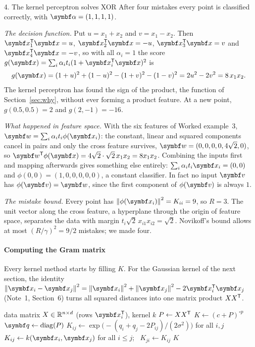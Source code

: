 \documentclass[11pt]{article}
\newcommand{\w}{\vect{w}}
\newcommand{\z}{\vect{z}}
\newcommand{\valpha}{\vect{\alpha}}
\begin{document}
\begin{worked}{4. The kernel perceptron solves XOR}
\noindent After four mistakes every point is classified correctly, with $\valpha = (1, 1, 1, 1)$.

\emph{The decision function.} Put $u = x_1 + x_2$ and $v = x_1 - x_2$. Then $\x_1\T\x = u$, $\x_2\T\x = -u$,
$\x_3\T\x = v$ and $\x_4\T\x = -v$, so with all $\alpha_i = 1$ the score $g(\x) = \sum_i \alpha_it_i(1 + \x_i\T\x)^2$ is
\[
  g(\x) = (1 + u)^2 + (1 - u)^2 - (1 + v)^2 - (1 - v)^2 = 2u^2 - 2v^2 = 8\,x_1x_2 .
\]
The kernel perceptron has found the sign of the product, the function of Section~\ref{sec:why}, without ever forming a
product feature. At a new point, $g(0.5, 0.5) = 2$ and $g(2, -1) = -16$.

\emph{What happened in feature space.} With the six features of Worked example~3, $\w = \sum_i \alpha_i t_i\phi(\x_i)$:
the constant, linear and squared components cancel in pairs and only the cross feature survives,
$\w = (0, 0, 0, 0, 4\sqrt2, 0)$, so $\w\T\phi(\x) = 4\sqrt2 \cdot \sqrt2\,x_1x_2 = 8x_1x_2$. Combining the inputs first
and mapping afterwards gives something else entirely: $\sum_i \alpha_i t_i \x_i = (0, 0)$ and $\phi(0, 0) = (1, 0, 0, 0,
0, 0)$, a constant classifier. In fact no input $\vect{v}$ has $\phi(\vect{v}) = \w$, since the first component of
$\phi(\vect{v})$ is always $1$.

\emph{The mistake bound.} Every point has $\norm{\phi(\x_i)}^2 = K_{ii} = 9$, so $R = 3$. The unit vector along the cross
feature, a hyperplane through the origin of feature space, separates the data with margin $t_i\sqrt2\,x_{i1}x_{i2} =
\sqrt2$. Novikoff's bound allows at most
$(R/\gamma)^2 = 9/2$ mistakes; we made four.
\end{worked}

\paragraph{Computing the Gram matrix} Every kernel method starts by filling $K$. For the Gaussian kernel of the next
section, the identity $\norm{\x_i - \x_j}^2 = \norm{\x_i}^2 + \norm{\x_j}^2 - 2\x_i\T\x_j$ (Note~1, Section~6) turns all
squared distances into one matrix product $XX^{\mathsf{T}}$.

\begin{algorithm}[htbp]
\caption{Gram matrix (vectorised)}\label{alg:gram}
\begin{algorithmic}[1]
\Require data matrix $X \in \mathbb{R}^{n \times d}$ (rows $\x_i\T$), kernel $k$
  \State $P \gets XX^{\mathsf{T}}$ 
  \If{$k$ is polynomial, $(c + \x\T\z)^p$}
    \State $K \gets (c + P)^{\circ p}$ 
    \State $\vect{q} \gets \operatorname{diag}(P)$ 
    \State $K_{ij} \gets \exp\!\big(-(q_i + q_j - 2P_{ij}) / (2\sigma^2)\big)$ for all $i, j$
  \Else
    \State $K_{ij} \gets k(\x_i, \x_j)$ for all $i \le j$; \ $K_{ji} \gets K_{ij}$ 
  \EndIf
  \State \Return $K$ 
\EndFunction
\end{algorithmic}
\end{algorithm}
\end{document}
